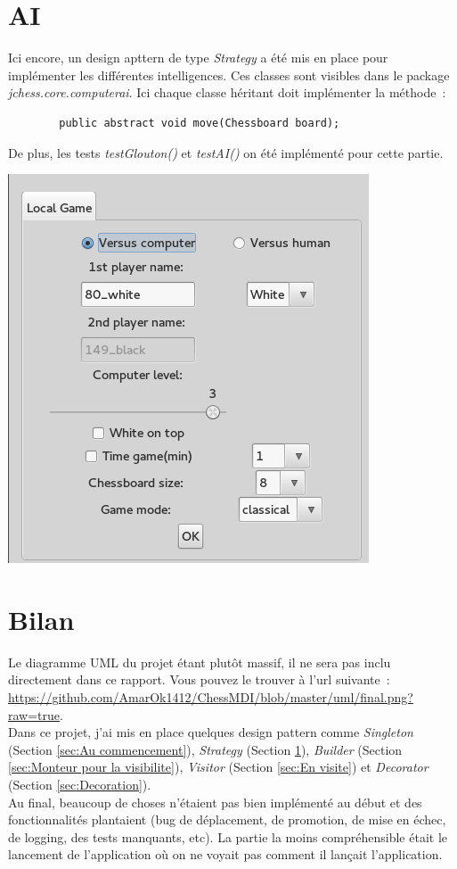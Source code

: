 \documentclass{article}
\begin{document}
	\section{AI}
	\label{sec:AI}
	Ici encore, un design apttern de type \emph{Strategy} a été mis en place pour implémenter les différentes intelligences. Ces classes sont visibles dans le package \emph{jchess.core.computerai}. Ici chaque classe héritant doit implémenter la méthode~:
	\begin{verbatim}
		public abstract void move(Chessboard board);
	\end{verbatim}
	De plus, les tests \emph{testGlouton()} et \emph{testAI()} on été implémenté pour cette partie.
	\begin{center}
		\includegraphics[scale=0.5]{img/AI}
		\label{AI}
	\end{center}

	\section{Bilan}
	\label{sec:Bilan}
	Le diagramme UML du projet étant plutôt massif, il ne sera pas inclu directement dans ce rapport. Vous pouvez le trouver à l'url suivante~: \url{https://github.com/AmarOk1412/ChessMDI/blob/master/uml/final.png?raw=true}.\\
	Dans ce projet, j'ai mis en place quelques design pattern comme \emph{Singleton} (Section \ref{sec:Au commencement}), \emph{Strategy} (Section \ref{sec:AI}), \emph{Builder} (Section \ref{sec:Monteur pour la visibilite}), \emph{Visitor} (Section \ref{sec:En visite}) et \emph{Decorator} (Section \ref{sec:Decoration}).\\
	Au final, beaucoup de choses n'étaient pas bien implémenté au début et des fonctionnalités plantaient (bug de déplacement, de promotion, de mise en échec, de logging, des tests manquants, etc). La partie la moins compréhensible était le lancement de l'application où on ne voyait pas comment il lançait l'application.
\end{document}
